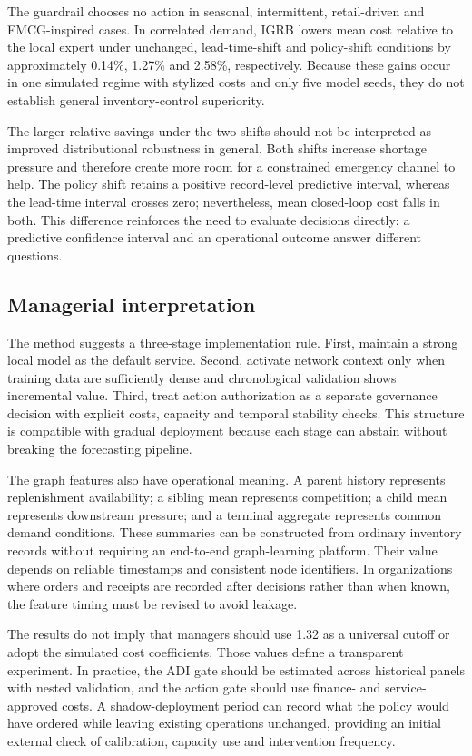 \documentclass[11pt,a4paper]{article}
\begin{document}
The guardrail chooses no action in seasonal, intermittent, retail-driven and FMCG-inspired cases. In correlated demand, IGRB lowers mean cost relative to the local expert under unchanged, lead-time-shift and policy-shift conditions by approximately 0.14\%, 1.27\% and 2.58\%, respectively. Because these gains occur in one simulated regime with stylized costs and only five model seeds, they do not establish general inventory-control superiority.

The larger relative savings under the two shifts should not be interpreted as improved distributional robustness in general. Both shifts increase shortage pressure and therefore create more room for a constrained emergency channel to help. The policy shift retains a positive record-level predictive interval, whereas the lead-time interval crosses zero; nevertheless, mean closed-loop cost falls in both. This difference reinforces the need to evaluate decisions directly: a predictive confidence interval and an operational outcome answer different questions.

\subsection{Managerial interpretation}
The method suggests a three-stage implementation rule. First, maintain a strong local model as the default service. Second, activate network context only when training data are sufficiently dense and chronological validation shows incremental value. Third, treat action authorization as a separate governance decision with explicit costs, capacity and temporal stability checks. This structure is compatible with gradual deployment because each stage can abstain without breaking the forecasting pipeline.

The graph features also have operational meaning. A parent history represents replenishment availability; a sibling mean represents competition; a child mean represents downstream pressure; and a terminal aggregate represents common demand conditions. These summaries can be constructed from ordinary inventory records without requiring an end-to-end graph-learning platform. Their value depends on reliable timestamps and consistent node identifiers. In organizations where orders and receipts are recorded after decisions rather than when known, the feature timing must be revised to avoid leakage.

The results do not imply that managers should use 1.32 as a universal cutoff or adopt the simulated cost coefficients. Those values define a transparent experiment. In practice, the ADI gate should be estimated across historical panels with nested validation, and the action gate should use finance- and service-approved costs. A shadow-deployment period can record what the policy would have ordered while leaving existing operations unchanged, providing an initial external check of calibration, capacity use and intervention frequency.
\end{document}
